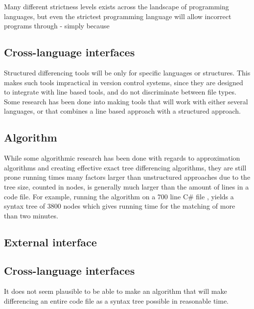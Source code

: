 \documentclass[11pt]{article}
\begin{document}

Many different strictness levels exists across the landscape of programming languages, but even the strictest programming language will allow incorrect programs through - simply because 


\subsection{Cross-language interfaces}
Structured differencing tools will be only for specific languages or structures. This makes such tools impractical in version control systems, since they are designed to integrate with line based tools, and do not discriminate between file types. Some research has been done into making tools that will work with either several languages, or that combines a line based approach with a structured approach.

\subsection{Algorithm}
While some algorithmic research 
has been done with regards to approximation algorithms and creating effective exact tree differencing algorithms, they are still prone running times many factors larger than unstructured approaches due to the tree size, counted in nodes, is generally much larger than the amount of lines in a code file. For example, running the \citet{Pawlik} algorithm on a 700 line C\# file , yields a syntax tree of 3800 nodes which gives running time for the matching of more than two minutes.




\subsection{External interface}

\subsection{Cross-language interfaces}

It does not seem plausible to be able to make an algorithm that will make differencing an entire code file as a syntax tree possible in reasonable time.
\end{document}
